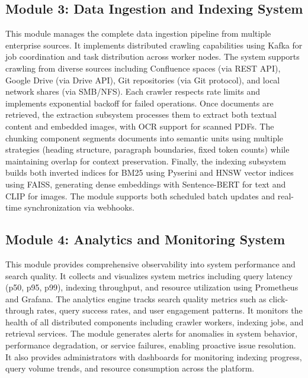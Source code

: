 \subsection{Module 3: Data Ingestion and Indexing System}
This module manages the complete data ingestion pipeline from multiple enterprise sources. It implements distributed crawling capabilities using Kafka for job coordination and task distribution across worker nodes. The system supports crawling from diverse sources including Confluence spaces (via REST API), Google Drive (via Drive API), Git repositories (via Git protocol), and local network shares (via SMB/NFS). Each crawler respects rate limits and implements exponential backoff for failed operations. Once documents are retrieved, the extraction subsystem processes them to extract both textual content and embedded images, with OCR support for scanned PDFs. The chunking component segments documents into semantic units using multiple strategies (heading structure, paragraph boundaries, fixed token counts) while maintaining overlap for context preservation. Finally, the indexing subsystem builds both inverted indices for BM25 using Pyserini and HNSW vector indices using FAISS, generating dense embeddings with Sentence-BERT for text and CLIP for images. The module supports both scheduled batch updates and real-time synchronization via webhooks.

\subsection{Module 4: Analytics and Monitoring System}
This module provides comprehensive observability into system performance and search quality. It collects and visualizes system metrics including query latency (p50, p95, p99), indexing throughput, and resource utilization using Prometheus and Grafana. The analytics engine tracks search quality metrics such as click-through rates, query success rates, and user engagement patterns. It monitors the health of all distributed components including crawler workers, indexing jobs, and retrieval services. The module generates alerts for anomalies in system behavior, performance degradation, or service failures, enabling proactive issue resolution. It also provides administrators with dashboards for monitoring indexing progress, query volume trends, and resource consumption across the platform.

